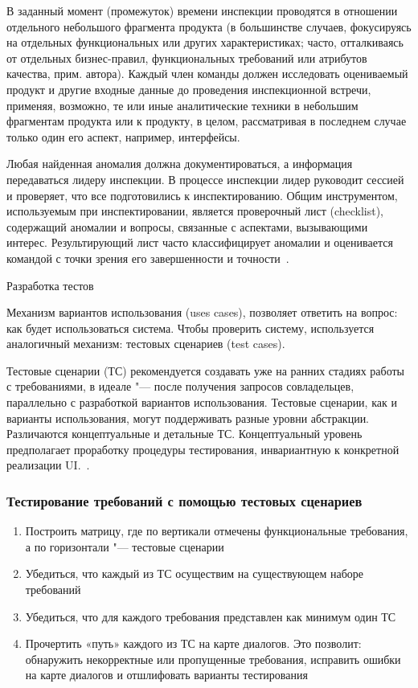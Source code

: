 \documentclass{../industrial-development}
\begin{document}
{В заданный момент (промежуток) времени инспекции проводятся в отношении отдельного небольшого фрагмента продукта (в большинстве случаев, фокусируясь на отдельных функциональных или других характеристиках; часто, отталкиваясь от отдельных бизнес-правил,
функциональных требований или атрибутов качества, прим. автора). Каждый член команды должен исследовать оцениваемый продукт и другие входные данные до проведения инспекционной встречи, применяя, возможно, те или иные аналитические техники в небольшим фрагментам продукта или к продукту, в целом, рассматривая в последнем случае только один его аспект, например, интерфейсы.

Любая найденная аномалия должна документироваться, а информация передаваться лидеру инспекции. В процессе инспекции лидер руководит сессией и проверяет, что все подготовились к инспектированию. Общим инструментом, используемым при инспектировании, является
проверочный лист (checklist), содержащий аномалии и вопросы, связанные с аспектами, вызывающими интерес. Результирующий лист часто классифицирует аномалии и оценивается командой с точки зрения его завершенности и точности~\cite[с.~67]{Maglinec}.

\alert{Разработка тестов}

Механизм вариантов использования (uses cases), позволяет ответить на вопрос: как будет использоваться система. Чтобы проверить
систему, используется аналогичный механизм: тестовых сценариев (test cases).

Тестовые сценарии (ТС) рекомендуется создавать уже на ранних стадиях работы с требованиями, в идеале "--- после получения запросов совладельцев, параллельно с разработкой вариантов использования. Тестовые сценарии, как и варианты использования, могут поддерживать разные уровни абстракции. Различаются концептуальные и детальные ТС. Концептуальный уровень предполагает проработку процедуры тестирования, инвариантную к конкретной реализации UI.~\cite[с.~67--68]{Maglinec}.


\begin{frame} \frametitle {Тестирование требований с помощью тестовых сценариев}
\begin{enumerate}
\item Построить матрицу, где по вертикали отмечены функциональные требования, а по горизонтали "--- тестовые сценарии
\item Убедиться, что каждый из ТС осуществим на существующем наборе требований
\item Убедиться, что для каждого требования представлен как минимум один ТС
\item Прочертить «путь» каждого из ТС на карте диалогов. Это позволит: обнаружить некорректные или пропущенные требования, исправить ошибки на карте диалогов и отшлифовать варианты тестирования
\end{enumerate}
\end{frame}

}
\end{document}
